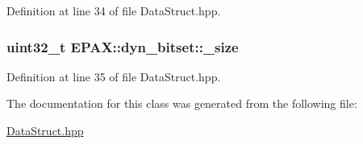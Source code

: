 \-Definition at line 34 of file \-Data\-Struct.\-hpp.

\hypertarget{class_e_p_a_x_1_1dyn__bitset_a7129eb0bab6e6e491887103d3527690b}{
\subsubsection[{\-\_\-size}]{\setlength{\rightskip}{0pt plus 5cm}uint32\-\_\-t {\bf \-E\-P\-A\-X\-::dyn\-\_\-bitset\-::\-\_\-size}}}\label{class_e_p_a_x_1_1dyn__bitset_a7129eb0bab6e6e491887103d3527690b}


\-Definition at line 35 of file \-Data\-Struct.\-hpp.



\-The documentation for this class was generated from the following file\-:\begin{DoxyCompactItemize}
\item 
\hyperlink{_data_struct_8hpp}{\-Data\-Struct.\-hpp}\end{DoxyCompactItemize}

